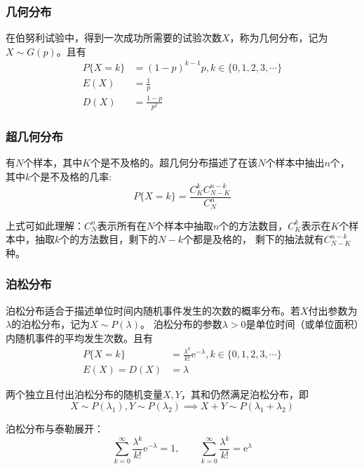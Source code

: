 \subsubsection{几何分布}
在伯努利试验中，得到一次成功所需要的试验次数$X$，称为几何分布，记为$X\sim G(p)$。且有
\begin{align}
    P\{X=k\} & = (1-p)^{k-1}p, k\in\{0,1,2,3,\cdots \} \label{eq:几何分布律} \\
    E(X)     & = \frac{1}{p} \label{eq:几何分布期望}                         \\
    D(X)     & = \frac{1-p}{p^2} \label{eq:几何分布方差}
\end{align}

\subsubsection{超几何分布}
有$N$个样本，其中$K$个是不及格的。超几何分布描述了在该$N$个样本中抽出$n$个，其中$k$个是不及格的几率:
\[ P\{ X=k \} = \frac{C_K^k C_{N-K}^{n-k}}{C_N^n} \]

上式可如此理解：$C_N^n$表示所有在$N$个样本中抽取$n$个的方法数目，$C_K^k$表示在$K$个样本中，抽取$k$个的方法数目，剩下的$N-k$个都是及格的，
剩下的抽法就有$C_{N-K}^{n-k}$种。

\subsubsection{泊松分布}
泊松分布适合于描述单位时间内随机事件发生的次数的概率分布。若$X$付出参数为$\lambda$的泊松分布，记为$X\sim P(\lambda)$。
泊松分布的参数$\lambda>0$是单位时间（或单位面积）内随机事件的平均发生次数。且有
\begin{align}
    P\{ X=k \} & = \frac{\lambda^k}{k!}\mathrm{e}^{-\lambda}, k\in\{0,1,2,3,\cdots\} \label{eq:泊松分布分布律} \\
    E(X)=D(X)  & =\lambda \label{eq:泊松分布期望方差}
\end{align}

两个独立且付出泊松分布的随机变量$X,Y$，其和仍然满足泊松分布，即
\[ X\sim P(\lambda_1), Y\sim P(\lambda_2) \implies X+Y \sim P(\lambda_1+\lambda_2) \]

泊松分布与泰勒展开：
\[
    \sum_{k=0}^\infty \frac{\lambda^k}{k!}\mathrm{e}^{-\lambda} = 1,
    \qquad
    \sum_{k=0}^\infty \frac{\lambda^k}{k!} = \mathrm{e}^\lambda
\]

